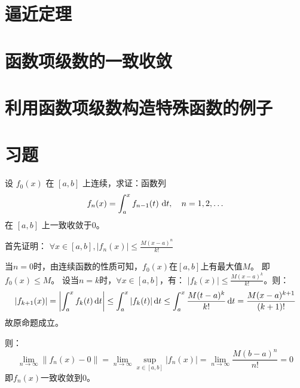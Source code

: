 \section{逼近定理}
\section{函数项级数的一致收敛}
\section{利用函数项级数构造特殊函数的例子}
\section{习题}

\begin{problem}
    设 \(f_0(x)\) 在 \([a, b]\) 上连续，求证：函数列
    \begin{align*}
        f_n(x) = \int_a^x f_{n-1}(t) \, \d{t}, \quad
        n = 1, 2, \dots
    \end{align*}
    在 \([a, b]\) 上一致收敛于0。
\end{problem}

\begin{solution}
    首先证明： \(\forall x \in [a,b], \left\vert f_{n}(x) \right\vert \le
    \frac{M(x-a)^{n}}{k!} \)

    当\(n=0\)时，由连续函数的性质可知，\(f_{0}(x)\)在\([a,b]\)上有最大值\(M\)。
    即\(f_{0}(x)\le M\)。
    设当\(n=k\)时，\(\forall x \in [a,b]\)，有： \(\left\vert f_{k}(x)
        \right\vert \le
    \frac{M(x-a)^{k}}{k!}\)。则：
    \[
        \left\vert f_{k+1}(x) \right\vert
        = \left\vert \int_{a}^{x} f_{k}(t) \d{t} \right\vert
        \le \int_{a}^{x} \left\vert f_{k}(t) \right\vert \d{t}
        \le \int_{a}^{x} \frac{M(t-a)^{k}}{k!} \d{t} =
        \frac{M(x-a)^{k+1}}{(k+1)!}
    \]
    故原命题成立。

    则：
    \[
        \lim_{n \to \infty} \left\lVert f_{n}(x) - 0 \right\rVert
        =\lim_{n \to \infty} \sup_{x \in [a,b]} \left\vert f_{n}(x)
        \right\vert = \lim_{n \to \infty} \frac{M(b-a)^{n}}{n!} = 0
    \]
    即\(f_{n}(x)\)一致收敛到\(0\)。
\end{solution}